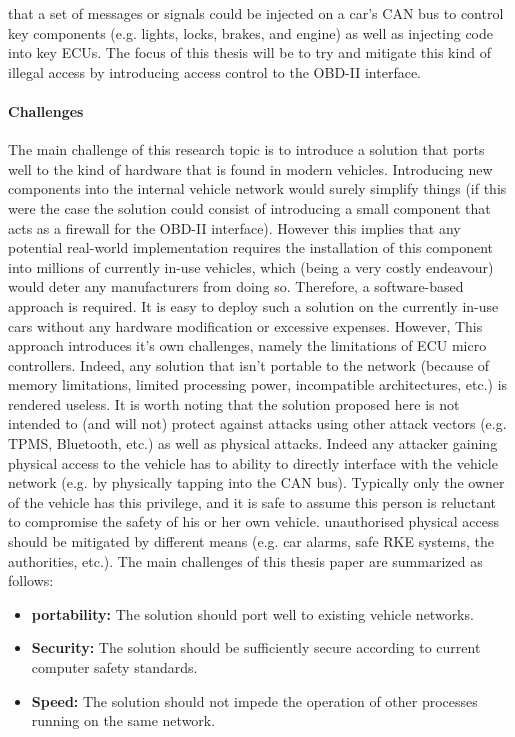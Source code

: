 \documentclass[11pt]{article}
\begin{document}
\cite{MillerA}\cite{Yadav16}\cite{MillerB}\cite{MillerC} that a set of messages or signals could be injected on a car's CAN bus to control key components (e.g. lights, locks, brakes, and engine) as well as injecting code into key ECUs. The focus of this thesis will be to try and mitigate this kind of illegal access by introducing access control to the OBD-II interface.

\paragraph{Challenges} \label{Challenges}
The main challenge of this research topic is to introduce a solution that ports well to the kind of hardware that is found in modern vehicles. Introducing new components into the internal vehicle network would surely simplify things (if this were the case the solution could consist of introducing a small component that acts as a firewall for the OBD-II interface). However this implies that any potential real-world implementation requires the installation of this component into millions of currently in-use vehicles, which (being a very costly endeavour) would deter any manufacturers from doing so. Therefore, a software-based approach is required. It is easy to deploy such a solution on the currently in-use cars without any hardware modification or excessive expenses. However, This approach introduces it's own challenges, namely the limitations of ECU micro controllers. Indeed, any solution that isn't portable to the network (because of memory limitations, limited processing power, incompatible architectures, etc.) is rendered useless. It is worth noting that the solution proposed here is not intended to (and will not) protect against attacks using other attack vectors (e.g. TPMS, Bluetooth, etc.) as well as physical attacks. Indeed any attacker gaining physical access to the vehicle has to ability to directly interface with the vehicle network (e.g. by physically tapping into the CAN bus). Typically only the owner of the vehicle has this privilege, and it is safe to assume this person is reluctant to compromise the safety of his or her own vehicle. unauthorised physical access should be mitigated by different means (e.g. car alarms, safe RKE systems, the authorities, etc.). The main challenges of this thesis paper are summarized as follows:

\begin{itemize}
	\item \textbf{portability:} The solution should port well to existing vehicle networks. 
	\item \textbf{Security:} The solution should be sufficiently secure according to current computer safety standards. 
	\item \textbf{Speed:} The solution should not impede the operation of other processes running on the same network.
\end{itemize}
\end{document}
